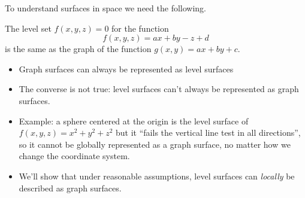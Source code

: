 \begin{frame}
To understand surfaces in space we need the following.
\begin{remark} The level set $f(x,y,z)=0$ for the function
%
$$f(x,y,z) = ax+by-z+d$$
%
is the same as the graph of the function $g(x,y) = ax+by+c$.
\end{remark}
\begin{itemize}
\item<2-> Graph surfaces can always be represented as level surfaces
\item<3-> The converse is not true: level surfaces can't always be represented as graph surfaces. 
\item<4-> Example: a sphere centered at the origin is the
level surface of $f(x,y,z) = x^2+y^2+z^2$ but it ``fails the vertical line test in all directions'', so it cannot be globally represented as a graph surface, no matter how we change the coordinate system.
\item<5-> We'll show that under reasonable assumptions, level surfaces can \emph{locally} be described as graph surfaces. 
\end{itemize}
\end{frame}
